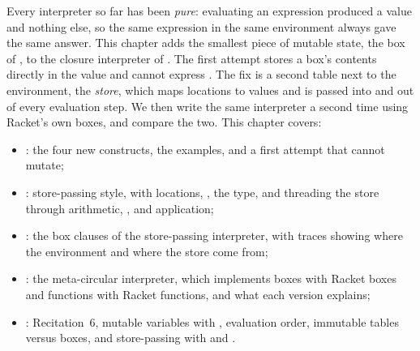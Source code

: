 Every interpreter so far has been \emph{pure}: evaluating an expression produced a value and nothing else, so the same expression in the same environment always gave the same answer. This chapter adds the smallest piece of mutable state, the box of , to the closure interpreter of . The first attempt stores a box's contents directly in the value and cannot express . The fix is a second table next to the environment, the \emph{store}, which maps locations to values and is passed into and out of every evaluation step. We then write the same interpreter a second time using Racket's own boxes, and compare the two. This chapter covers:
\begin{itemize}
  \item {}: the four new constructs, the examples, and a first attempt that cannot mutate;
  \item {}: store-passing style, with locations, , the  type, and threading the store through arithmetic, , and application;
  \item {}: the box clauses of the store-passing interpreter, with traces showing where the environment and where the store come from;
  \item {}: the meta-circular interpreter, which implements boxes with Racket boxes and functions with Racket functions, and what each version explains;
  \item {}: Recitation~6, mutable variables with , evaluation order, immutable tables versus boxes, and store-passing with  and .
\end{itemize}






